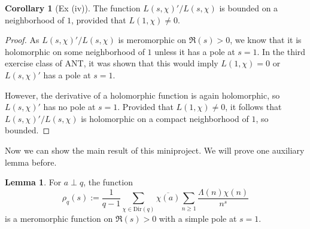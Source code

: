 \documentclass{scrartcl}
\theoremstyle{definition}
\newtheorem{lemma}[definition]{Lemma}
\newtheorem{corollary}[definition]{Corollary}
\begin{document}
\begin{corollary}[Ex (iv)]
    \label{prop:logarithmic_derivative_L_bounded}
    The function $L(s, \chi)'/L(s, \chi)$ is bounded on a neighborhood of $1$, provided that $L(1, \chi) \neq 0$.
\end{corollary}
\begin{proof}
    As $L(s, \chi)'/L(s, \chi)$ is meromorphic on $\Re(s) > 0$, we know that it is holomorphic on some neighborhood of $1$ unless it has a pole at $s = 1$.
    In the third exercise class of ANT, it was shown that this would imply $L(1, \chi) = 0$ or $L(s, \chi)'$ has a pole at $s = 1$.

    However, the derivative of a holomorphic function is again holomorphic, so $L(s, \chi)'$ has no pole at $s = 1$.
    Provided that $L(1, \chi) \neq 0$, it follows that $L(s, \chi)'/L(s, \chi)$ is holomorphic on a compact neighborhood of $1$, so bounded.
\end{proof}
Now we can show the main result of this miniproject.
We will prove one auxiliary lemma before.
\begin{lemma}
    For $a \perp q$, the function
    \begin{equation*}
        \rho_q(s) := \frac 1 {q - 1} \sum_{\chi \in \mathrm{Dir}(q)} \overline{\chi(a)} \sum_{n \geq 1} \frac {\Lambda(n) \chi(n)} {n^s}
    \end{equation*}
    is a meromorphic function on $\Re(s) > 0$ with a simple pole at $s = 1$. 
\end{lemma}
\end{document}
